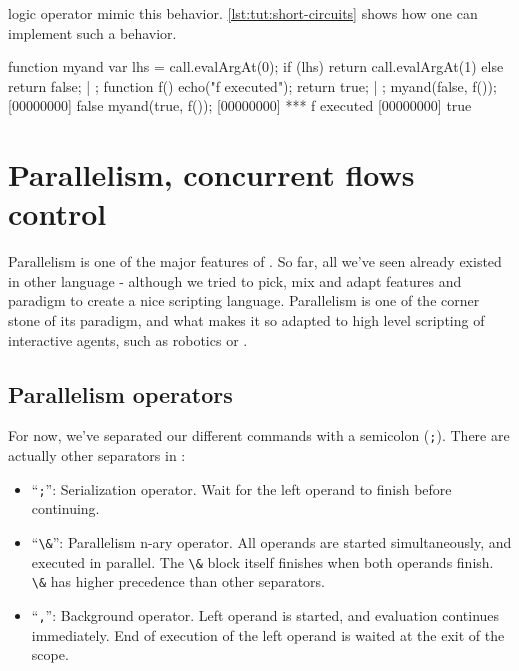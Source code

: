 \us logic operator mimic this behavior. \autoref{lst:tut:short-circuits} shows
how one can implement such a behavior.

\begin{urbiscript}[caption=Implementing logic short circuits,
label=lst:tut:short-circuits]
function myand
{
  var lhs = call.evalArgAt(0);
  if (lhs)
    return call.evalArgAt(1)
  else
    return false;
} | {};
function f()
{
  echo("f executed");
  return true;
} | {};
myand(false, f());
[00000000] false
myand(true, f());
[00000000] *** f executed
[00000000] true
\end{urbiscript}


\chapter{Parallelism, concurrent flows control}

Parallelism is one of the major features of \us. So far, all we've
seen already existed in other language - although we tried to pick,
mix and adapt features and paradigm to create a nice scripting
language. Parallelism is one of the corner stone of its paradigm, and
what makes it so adapted to high level scripting of interactive
agents, such as robotics or \ai.

\section{Parallelism operators}

For now, we've separated our different commands with a semicolon
(\lstinline{;}). There are actually other separators in \us:

\begin{itemize}
\item ``\lstinline{;}'': Serialization operator. Wait for the left
  operand to finish before continuing.
\item ``\lstinline{\&}'': Parallelism n-ary operator. All operands are
  started simultaneously, and executed in parallel. The \lstinline{\&}
  block itself finishes when both operands finish. \lstinline{\&} has
  higher precedence than other separators.
\item ``\lstinline{,}'': Background operator. Left operand is started,
  and evaluation continues immediately. End of execution of the left
  operand is waited at the exit of the scope.
\end{itemize}

